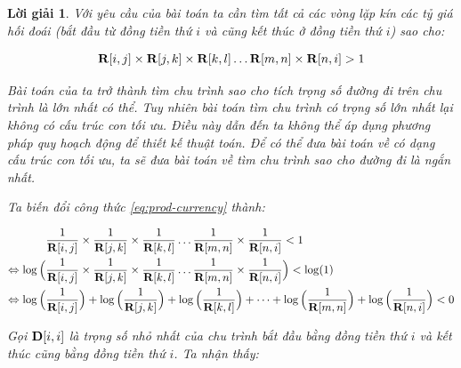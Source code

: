 \documentclass[14pt, a4paper]{article}
\theoremstyle{sltheorem}
\theoremstyle{soltheorem}
\newtheorem*{loigiai}{Lời giải}
\begin{document}
    \begin{loigiai}

        Với yêu cầu của bài toán ta cần tìm tất cả các vòng lặp kín các tỷ giá hối đoái (bắt đầu từ đồng tiền thứ $i$ và cũng kết thúc ở đồng tiền thứ $i$) sao cho:


        \begin{equation}
            \bold{R} \lbrack i, j \rbrack \times \bold{R} \lbrack j, k \rbrack \times \bold{R} \lbrack k, l \rbrack \dots \bold{R} \lbrack m, n \rbrack \times \bold{R} \lbrack n, i \rbrack > 1
            \label{eq:prod-currency}
        \end{equation}

        Bài toán của ta trở thành tìm chu trình sao cho tích trọng số đường đi trên chu trình là lớn nhất có thể.
        Tuy nhiên bài toán tìm chu trình có trọng số lớn nhất lại không có cấu trúc con tối ưu.
        Điều này dẫn đến ta không thể áp dụng phương pháp quy hoạch động để thiết kế thuật toán.
        Để có thể đưa bài toán về có dạng cấu trúc con tối ưu, ta sẽ đưa bài toán về tìm chu trình sao cho đường đi là ngắn nhất.

        Ta biến đổi công thức \ref{eq:prod-currency} thành:

        \begin{equation*}
            \begin{aligned}
                &\dfrac{1}{\bold{R} \lbrack i, j \rbrack} \times \dfrac{1}{\bold{R} \lbrack j, k \rbrack} \times \dfrac{1}{\bold{R} \lbrack k, l \rbrack} \dots \dfrac{1}{\bold{R} \lbrack m, n \rbrack} \times \dfrac{1}{\bold{R} \lbrack n, i \rbrack} < 1 \\
                \Leftrightarrow  \log\Big( & \dfrac{1}{\bold{R} \lbrack i, j \rbrack} \times \dfrac{1}{\bold{R} \lbrack j, k \rbrack} \times \dfrac{1}{\bold{R} \lbrack k, l \rbrack} \dots \dfrac{1}{\bold{R} \lbrack m, n \rbrack} \times \dfrac{1}{\bold{R} \lbrack n, i \rbrack} \Big) < \log(1) \\
                \Leftrightarrow \log\Big( & \dfrac{1}{\bold{R} \lbrack i, j \rbrack} \Big) + \log\Big( \dfrac{1}{\bold{R} \lbrack j, k \rbrack} \Big) + \log\Big( \dfrac{1}{\bold{R} \lbrack k, l \rbrack} \Big) + \dots + \log\Big( \dfrac{1}{\bold{R} \lbrack m, n \rbrack} \Big) + \log\Big( \dfrac{1}{\bold{R} \lbrack n, i \rbrack} \Big) < 0
            \end{aligned}
        \end{equation*}

        Gọi $\bold{D} \lbrack i, i \rbrack$ là trọng số nhỏ nhất của chu trình bắt đầu bằng đồng tiền thứ $i$ và kết thúc cũng bằng đồng tiền thứ $i$.
        Ta nhận thấy:


\end{loigiai}
\end{document}
